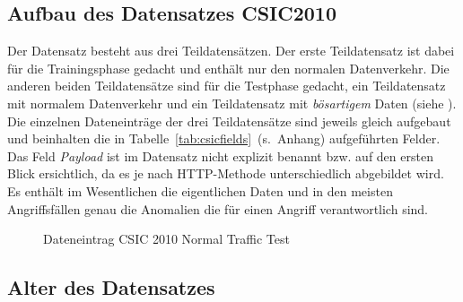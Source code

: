 %

\subsection{Aufbau des Datensatzes CSIC2010}


Der Datensatz besteht aus drei Teildatensätzen. Der erste Teildatensatz ist dabei für die Trainingsphase gedacht und enthält nur den normalen Datenverkehr. Die anderen beiden Teildatensätze sind für die Testphase gedacht, ein Teildatensatz mit normalem Datenverkehr und ein Teildatensatz mit \emph{bösartigem} Daten (siehe \cite{csic2010}). Die einzelnen Dateneinträge der drei Teildatensätze sind jeweils gleich aufgebaut und beinhalten die in Tabelle~\ref{tab:csicfields}~(s.~Anhang) aufgeführten Felder. Das Feld \emph{Payload} ist im Datensatz nicht explizit benannt bzw. auf den ersten Blick ersichtlich, da es je nach HTTP-Methode unterschiedlich abgebildet wird. Es enthält im Wesentlichen die eigentlichen Daten und in den meisten Angriffsfällen genau die Anomalien die für einen Angriff verantwortlich sind.

\begin{figure}
  \centering
        \caption{Dateneintrag CSIC 2010 Normal Traffic Test}
        \label{fig:csisexample}
\end{figure}


\subsection{Alter des Datensatzes}

